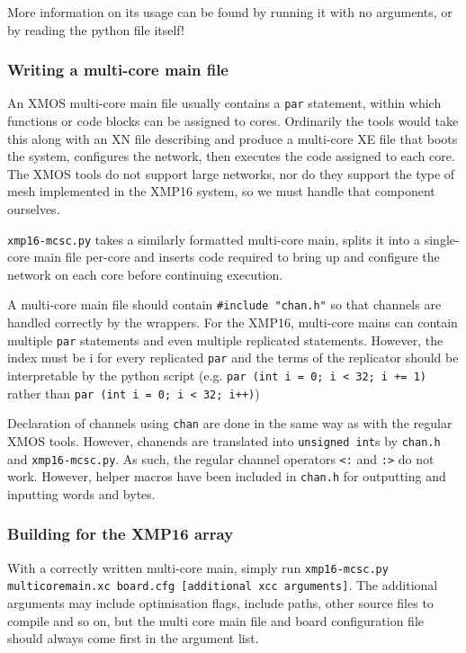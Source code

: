 \documentclass[12pt,a4paper,final,twoside]{article}
\begin{document}
More information on its usage can be found by running it with no arguments, or by reading the python file itself!

\subsubsection{Writing a multi-core main file}

An XMOS multi-core main file usually contains a \texttt{par} statement, within which functions or code blocks can be assigned to cores. Ordinarily the tools would take this along with an XN file describing and produce a multi-core XE file that boots the system, configures the network, then executes the code assigned to each core. The XMOS tools do not support large networks, nor do they support the type of mesh implemented in the XMP16 system, so we must handle that component ourselves.

\texttt{xmp16-mcsc.py} takes a similarly formatted multi-core main, splits it into a single-core main file per-core and inserts code required to bring up and configure the network on each core before continuing execution.

A multi-core main file should contain \texttt{\#include "chan.h"} so that channels are handled correctly by the wrappers. For the XMP16, multi-core mains can contain multiple \texttt{par} statements and even multiple replicated statements. However, the index must be i for every replicated \texttt{par} and the terms of the replicator should be interpretable by the python script (e.g. \texttt{par (int i = 0; i < 32; i += 1)} rather than \texttt{par (int i = 0; i < 32; i++)})

Declaration of channels using \texttt{chan} are done in the same way as with the regular XMOS tools. However, chanends are translated into \texttt{unsigned int}s by \texttt{chan.h} and \texttt{xmp16-mcsc.py}. As such, the regular channel operators \texttt{<:} and \texttt{:>} do not work. However, helper macros have been included in \texttt{chan.h} for outputting and inputting words and bytes.

\subsubsection{Building for the XMP16 array}

With a correctly written multi-core main, simply run  \texttt{xmp16-mcsc.py multicoremain.xc board.cfg [additional xcc arguments]}. The additional arguments may include optimisation flags, include paths, other source files to compile and so on, but the multi core main file and board configuration file should always come first in the argument list.
\end{document}
